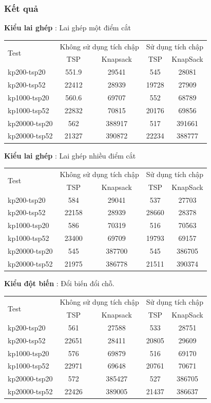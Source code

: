 \documentclass[a4paper,12pt]{report}
\begin{document}
\subsubsection{Kết quả}

\textbf{Kiểu lai ghép} : Lai ghép một điểm cắt


\begin{longtable}{|l |c |c |c |c|}
\hline
\multirow{2}{*}{Test} 
& \multicolumn{2}{c|}{Không sử dụng tích chập} &\multicolumn{2}{|c|}{Sử dụng tích chập} \\
\cline{2-5}
&TSP & Knapsack & TSP & KnapSack \\
\hline
kp200-tsp20  & 551.9&29541 &545 &28081 
\\ \hline
kp200-tsp52&22412 &28939&19728 &27909 \\ \hline
kp1000-tsp20 &560.6&69707&552&68789 \\ \hline
kp1000-tsp52 &22832&70815&20176&69856 \\ \hline
kp20000-tsp20 &562&388917&517 &391661 \\ \hline
kp20000-tsp52 &21327&390872&22234& 388777\\ \hline
\end{longtable}

\textbf{Kiểu lai ghép} : Lai ghép nhiều điểm cắt

\begin{longtable}{|l |c |c |c |c|}
\hline
\multirow{2}{*}{Test} 
& \multicolumn{2}{c|}{Không sử dụng tích chập} &\multicolumn{2}{|c|}{Sử dụng tích chập} \\
\cline{2-5}
&TSP & Knapsack & TSP & KnapSack \\
\hline
kp200-tsp20  & 584&29041 &537 &27703 
\\ \hline
kp200-tsp52&22158 &28939&28660 &28378 \\ \hline
kp1000-tsp20 &586&70319&516&70563 \\ \hline
kp1000-tsp52 &23400&69709&19793&69157 \\ \hline
kp20000-tsp20 &545&387700&545 &386705 \\ \hline
kp20000-tsp52 &21975&386778&21511& 390374\\ \hline
\end{longtable}
\textbf{Kiểu đột biến} : Đổi biến đổi chỗ.

\begin{longtable}{|l |c |c |c |c|}
\hline
\multirow{2}{*}{Test} 
& \multicolumn{2}{c|}{Không sử dụng tích chập} &\multicolumn{2}{|c|}{Sử dụng tích chập} \\
\cline{2-5}
&TSP & Knapsack & TSP & KnapSack \\
\hline
kp200-tsp20  & 561&27588 &533 &28751 
\\ \hline
kp200-tsp52&22651 &28411&20805 &29609 \\ \hline
kp1000-tsp20 &576&69879&516&69170 \\ \hline
kp1000-tsp52 &22971&69648&20761&70671 \\ \hline
kp20000-tsp20 &572&385427&527 &386705 \\ \hline

kp20000-tsp52 &22426 & 389005 & 21437 & 386637\\
\hline
\end{longtable}
\end{document}
